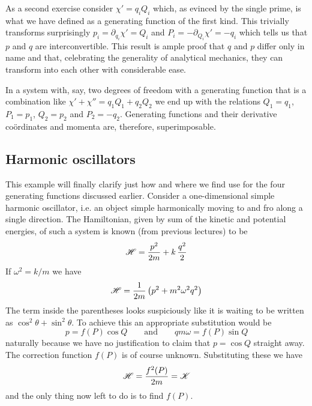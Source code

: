 \documentclass[english,seminar,headertitle]{lecture}
\newcommand{\ham}{\mathscr{H}}
\begin{document}
As a second exercise consider $\chi' = q_iQ_i$ which, as evinced by the single prime, is what we have defined as a generating function of the first kind. This trivially transforms surprisingly $p_i = \partial_{q_i} \chi' = Q_i$ and $P_i = - \partial_{Q_i} \chi' = -q_i$ which tells us that $p$ and $q$ are interconvertible. This result is ample proof that $q$ and $p$ differ only in name and that, celebrating the generality of analytical mechanics, they can transform into each other with considerable ease.\newline

In a system with, say, two degrees of freedom with a generating function that is a combination like $\chi' + \chi'' = q_1Q_1 + q_2Q_2$ we end up with the relations $Q_1 = q_1$, $P_1 = p_1$, $Q_2 = p_2$ and $P_2 = -q_2$. Generating functions and their derivative co\"{o}rdinates and momenta are, therefore, superimposable.

\subsection{Harmonic oscillators}

This example will finally clarify just how and where we find use for the four generating functions discussed earlier. Consider a one-dimensional simple harmonic oscillator, i.e. an object simple harmonically moving to and fro along a single direction. The Hamiltonian, given by sum of the kinetic and potential energies, of such a system is known (from previous lectures) to be
$$
\ham = {p^2 \over 2m}+k\,{q^2 \over 2}
$$
If $\omega^2 = k/m$ we have
$$
\ham = {1 \over 2m} \left( p^2 + m^2\omega^2q^2 \right)
$$
The term inside the parentheses looks suspiciously like it is waiting to be written as $\cos^2 \theta + \sin^2 \theta$. To achieve this an appropriate substitution would be
$$
p = f(P) \cos Q \qquad\textrm{and}\qquad qm\omega = f(P) \sin Q
$$
naturally because we have no justification to claim that $p=\cos Q$ straight away. The correction function $f(P)$ is of course unknown. Substituting these we have
$$
\ham = {f^2(P) \over 2m} = \mathscr{K}
$$
and the only thing now left to do is to find $f(P)$.
\end{document}

